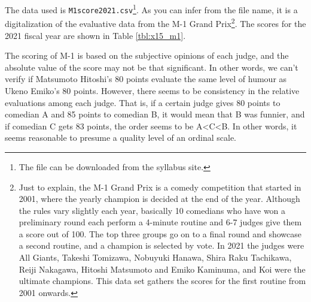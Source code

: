 \documentclass{ltjsbook}
\begin{document}
The data used is \verb|M1score2021.csv|\footnote{The file can be downloaded from the syllabus site.}. As you can infer from the file name, it is a digitalization of the evaluative data from the M-1 Grand Prix\footnote{Just to explain, the M-1 Grand Prix is a comedy competition that started in 2001, where the yearly champion is decided at the end of the year. Although the rules vary slightly each year, basically 10 comedians who have won a preliminary round each perform a 4-minute routine and 6-7 judges give them a score out of 100. The top three groups go on to a final round and showcase a second routine, and a champion is selected by vote. In 2021 the judges were All Giants, Takeshi Tomizawa, Nobuyuki Hanawa, Shira Raku Tachikawa, Reiji Nakagawa, Hitoshi Matsumoto and Emiko Kaminuma, and Koi were the ultimate champions. This data set gathers the scores for the first routine from 2001 onwards.}. The scores for the 2021 fiscal year are shown in Table \ref{tbl:x15_m1}.




The scoring of M-1 is based on the subjective opinions of each judge, and the absolute value of the score may not be that significant. In other words, we can't verify if Matsumoto Hitoshi's 80 points evaluate the same level of humour as Ukeno Emiko's 80 points.  However, there seems to be consistency in the relative evaluations among each judge. That is, if a certain judge gives 80 points to comedian A and 85 points to comedian B, it would mean that B was funnier, and if comedian C gets 83 points, the order seems to be A<C<B. In other words, it seems reasonable to presume a quality level of an ordinal scale.
\end{document}
